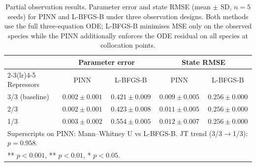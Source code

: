 \begin{table}[htbp]
\centering
\caption{Partial observation results. Parameter error and state RMSE (mean $\pm$ SD, $n = 5$ seeds) for PINN and L-BFGS-B under three observation designs. Both methods use the full three-equation ODE; L-BFGS-B minimises MSE only on the observed species while the PINN additionally enforces the ODE residual on all species at collocation points.}
\label{tab:exp2_partial_observation}
{\small\setlength{\tabcolsep}{5pt}%
\begin{tabular}{lcccc}
\toprule
 & \multicolumn{2}{c}{Parameter error} & \multicolumn{2}{c}{State RMSE} \\
\cmidrule(lr){2-3}\cmidrule(lr){4-5}
Repressors & PINN & L-BFGS-B & PINN & L-BFGS-B \\
\midrule
3/3 (baseline) & $0.002 \pm 0.001$\rlap{\textsuperscript{**}} & $0.421 \pm 0.009$ & $0.009 \pm 0.005$ & $0.256 \pm 0.000$ \\
2/3 & $0.002 \pm 0.001$\rlap{\textsuperscript{**}} & $0.423 \pm 0.008$ & $0.011 \pm 0.005$ & $0.256 \pm 0.000$ \\
1/3 & $0.003 \pm 0.002$\rlap{\textsuperscript{**}} & $0.554 \pm 0.005$ & $0.012 \pm 0.007$ & $0.256 \pm 0.000$ \\
\bottomrule
\multicolumn{5}{l}{\footnotesize Superscripts on PINN: Mann--Whitney U vs L-BFGS-B. JT trend (3/3$\to$1/3): $p = 0.958$.} \\
\multicolumn{5}{l}{\footnotesize *** $p < 0.001$, ** $p < 0.01$, * $p < 0.05$.} \\
\end{tabular}}
\end{table}
